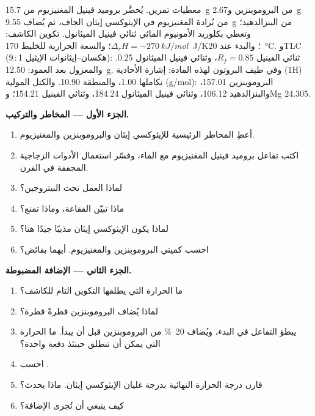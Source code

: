 \begin{problem}
\label{pb:b2:lab-techniques-2:1}
معطيات تمرين. يُحضَّر بروميد فينيل المغنيزيوم من \qty{15.7}{g} من البروموبنزين و\qty{2.67}{g} من
بُرادة المغنيزيوم في الإيثوكسي إيثان الجاف، ثم يُضاف \qty{9.55}{g} من البنزالدهيد؛ وتعطي 
بكلوريد الأمونيوم المائي ثنائي فينيل الميثانول. تكوين الكاشف: $\Delta_rH =
\qty{-270}{kJ/mol}$؛ والسعة الحرارية للخليط \qty{170}{J/K}؛ والبدء عند \qty{20}{\degreeCelsius}. وTLC
(9\,:\,1 هكسان--إيثانوات الإيثيل): ثنائي الفينيل $R_f = 0.85$، وثنائي فينيل الميثانول 0.25. والمعزول بعد العمود:
\qty{12.50}{g}. وفي طيف البروتون لهذه المادة: إشارة  الأحادية (1H) تكاملها 1.00، والمنطقة
 10.90. والكتل المولية (\unit{g/mol}): البروموبنزين 157.01، والبنزالدهيد 106.12، وثنائي فينيل الميثانول
184.24، وثنائي الفينيل 154.21؛ وMg 24.305.

\medskip
\noindent\textbf{الجزء الأول --- المخاطر والتركيب.}
\begin{enumerate}
  \item أعطِ المخاطر الرئيسية للإيثوكسي إيثان والبروموبنزين والمغنيزيوم.
  \item اكتب تفاعل بروميد فينيل المغنيزيوم مع الماء، وفسّر استعمال الأدوات الزجاجية المجففة في الفرن.
  \item لماذا العمل تحت النيتروجين؟
  \item ماذا تبيّن الفقاعة، وماذا تمنع؟
  \item لماذا يكون الإيثوكسي إيثان مذيبًا جيدًا هنا؟
  \item احسب كميتي البروموبنزين والمغنيزيوم. أيهما بفائض؟
\end{enumerate}

\medskip
\noindent\textbf{الجزء الثاني --- الإضافة المضبوطة.}
\begin{enumerate}[resume]
  \item ما الحرارة التي يطلقها التكوين التام للكاشف؟
  \item لماذا يُضاف البروموبنزين قطرةً قطرة؟
  \item يبطؤ التفاعل في البدء، ويُضاف 20~\% من البروموبنزين قبل أن يبدأ. ما الحرارة التي
        يمكن أن تنطلق حينئذ دفعة واحدة؟
  \item احسب .
  \item قارن درجة الحرارة النهائية بدرجة غليان الإيثوكسي إيثان. ماذا يحدث؟
  \item كيف ينبغي أن تُجرى الإضافة؟
\end{enumerate}


\end{problem}
